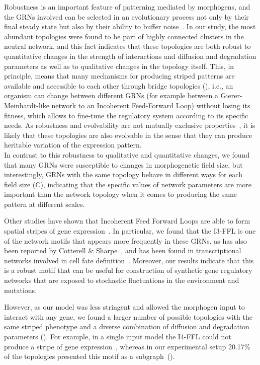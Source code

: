 \documentclass[10pt,letterpaper]{article}
\begin{document}
Robustness is an important feature of patterning mediated by morphogens, and
the GRNs involved can be selected in an evolutionary process not only by their final
steady state but also by their ability to buffer noise~\cite{lo_robust_2015, exelby_2021}.
In our study, the most abundant topologies were
found to be part of highly connected clusters in the neutral network, and this fact
indicates that these topologies are both robust to quantitative changes in the
strength of interactions and diffusion and degradation parameters as well as to
qualitative changes in the topology itself. This, in principle, means that many
mechanisms for producing striped patterns are available and accessible to each
other through bridge topologies (), i.e.,
an organism can change between different GRNs (for example between
a Gierer-Meinhardt-like network to an Incoherent Feed-Forward Loop) without losing its
fitness, which allows to fine-tune the regulatory system according to its specific
needs. As robustness and evolvability are
not mutually exclusive properties~\cite{wagner_robustness_2008}, it is likely
that these topologies are also evolvable in the sense that they can produce
heritable variation of the expression pattern.\\

In contrast to this robustness to
qualitative and quantitative changes, we found that many GRNs were susceptible
to changes in morphogenetic field size, but interestingly, GRNs with the same
topology behave in different ways for each field size (C),
indicating that the specific values of network parameters are more important
than the network topology when it comes to producing the same pattern at
different scales.

Other studies have shown that Incoherent Feed Forward Loops are able to form
spatial stripes of gene expression~\cite{ishihara_cross_2005}. In particular,
we found that the I3-FFL is one of the network motifs that appears more
frequently in these GRNs, as has also been reported by Cotterell \&
Sharpe~\cite{Cotterell2010}, and has been found in transcriptional networks involved
in cell fate definition~\cite{Li2019}. Moreover, our results indicate that this
is a robust motif that can be useful for construction of synthetic gene
regulatory networks that are exposed to stochastic fluctuations in the
environment and mutations.

However, as our model was less stringent and allowed the morphogen input to
interact with any gene, we found a larger number of possible topologies with the
same striped phenotype and a diverse combination of diffusion and degradation
parameters ().
For example, in a single input model the I4-FFL could
not produce a stripe of gene expression~\cite{munteanu_2014}, whereas in our
experimental setup 20.17\% of the topologies presented this motif as a
subgraph~().
\end{document}
